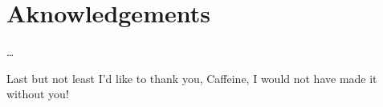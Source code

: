 \chapter*{Aknowledgements}
{}


\dots{}

Last but not least I'd like to thank you, Caffeine, I would not have made it without you!


